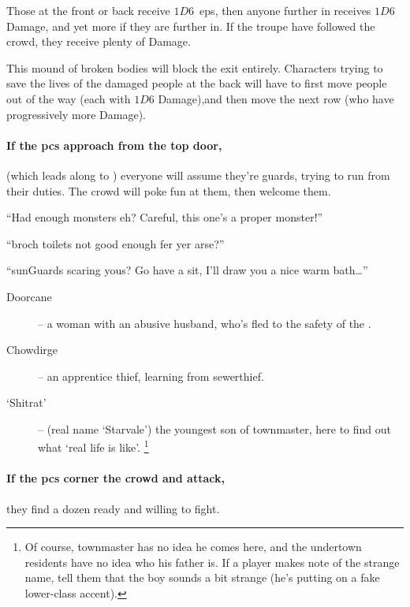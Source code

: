 \begin{multicols}{2}
Those at the front or back receive $1D6$~\glspl{ep}, then anyone further in receives $1D6$ Damage, and yet more if they are further in.
If the troupe have followed the crowd, they receive plenty of Damage.

This mound of broken bodies will block the exit entirely.
Characters trying to save the lives of the damaged people at the back will have to first move people out of the way (each with $1D6$ Damage),and then move the next row (who have progressively more Damage).

\paragraph{If the \glspl{pc} approach from the top door,}
(which leads along to ) everyone will assume they're \glspl{guard}, trying to run from their duties.
The crowd will poke fun at them, then welcome them.

\null
\begin{speechtext}
  ``Had enough monsters eh?
  Careful, this one's a proper monster!''

  ``\Gls{broch} toilets not good enough fer yer arse?''

  ``\Glspl{sunGuard} scaring yous?
  Go have a sit, I'll draw you a nice warm bath\ldots''
\end{speechtext}

\begin{description}
  \item[Doorcane] -- a woman with an abusive husband, who's fled to the safety of the .
  \item[Chowdirge] -- an apprentice thief, learning from \gls{sewerthief}.
  \item[`Shitrat'] -- (real name `Starvale') the youngest son of \gls{townmaster}, here to find out what `real life is like'.%
  \footnote{Of course, \gls{townmaster} has no idea he comes here, and the undertown residents have no idea who his father is.  If a player makes note of the strange name, tell them that the boy sounds a bit strange (he's putting on a fake lower-class accent).}
\end{description}

\paragraph{If the \glspl{pc} corner the crowd and attack,}
they find a dozen ready and willing to fight.


\end{multicols}
